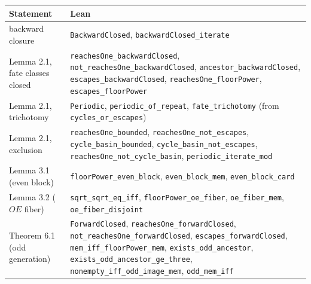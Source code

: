 \documentclass[11pt,a4paper]{article}
\begin{document}
\begin{longtable}[]{@{}
  >{\raggedright\arraybackslash}p{}
  >{\raggedright\arraybackslash}p{}@{}}
\toprule\noalign{}
\begin{minipage}[b]{\linewidth}\raggedright
Statement
\end{minipage} & \begin{minipage}[b]{\linewidth}\raggedright
Lean
\end{minipage} \\
\midrule\noalign{}
\endhead
\bottomrule\noalign{}
\endfoot
\bottomrule\noalign{}
\endlastfoot
backward closure & \texttt{\nolinkurl{BackwardClosed}},
\texttt{\nolinkurl{backwardClosed_iterate}} \\
Lemma 2.1, fate classes closed &
\texttt{\nolinkurl{reachesOne_backwardClosed}},
\texttt{\nolinkurl{not_reachesOne_backwardClosed}},
\texttt{\nolinkurl{ancestor_backwardClosed}},
\texttt{\nolinkurl{escapes_backwardClosed}},
\texttt{\nolinkurl{reachesOne_floorPower}},
\texttt{\nolinkurl{escapes_floorPower}} \\
Lemma 2.1, trichotomy & \texttt{\nolinkurl{Periodic}},
\texttt{\nolinkurl{periodic_of_repeat}},
\texttt{\nolinkurl{fate_trichotomy}} (from
\texttt{\nolinkurl{cycles_or_escapes}}) \\
Lemma 2.1, exclusion & \texttt{\nolinkurl{reachesOne_bounded}},
\texttt{\nolinkurl{reachesOne_not_escapes}},
\texttt{\nolinkurl{cycle_basin_bounded}},
\texttt{\nolinkurl{cycle_basin_not_escapes}},
\texttt{\nolinkurl{reachesOne_not_cycle_basin}},
\texttt{\nolinkurl{periodic_iterate_mod}} \\
Lemma 3.1 (even block) & \texttt{\nolinkurl{floorPower_even_block}},
\texttt{\nolinkurl{even_block_mem}},
\texttt{\nolinkurl{even_block_card}} \\
Lemma 3.2 (\(OE\) fiber) & \texttt{\nolinkurl{sqrt_sqrt_eq_iff}},
\texttt{\nolinkurl{floorPower_oe_fiber}},
\texttt{\nolinkurl{oe_fiber_mem}},
\texttt{\nolinkurl{oe_fiber_disjoint}} \\
Theorem 6.1 (odd generation) & \texttt{\nolinkurl{ForwardClosed}},
\texttt{\nolinkurl{reachesOne_forwardClosed}},
\texttt{\nolinkurl{not_reachesOne_forwardClosed}},
\texttt{\nolinkurl{escapes_forwardClosed}},
\texttt{\nolinkurl{mem_iff_floorPower_mem}},
\texttt{\nolinkurl{exists_odd_ancestor}},
\texttt{\nolinkurl{exists_odd_ancestor_ge_three}},
\texttt{\nolinkurl{nonempty_iff_odd_image_mem}},
\texttt{\nolinkurl{odd_mem_iff}} \\

\end{longtable}
\end{document}
